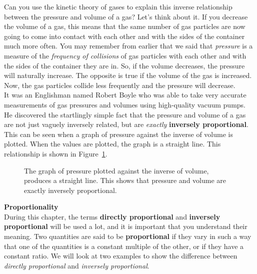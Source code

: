 Can you use the kinetic theory of gases to explain this inverse relationship between the pressure and volume of a gas? Let's think about it. If you decrease the volume of a gas, this means that the same number of gas particles are now going to come into contact with each other and with the sides of the container much more often. You may remember from earlier that we said that \textit{pressure} is a measure of the \textit{frequency of collisions} of gas particles with each other and with the sides of the container they are in. So, if the volume decreases, the pressure will naturally increase. The opposite is true if the volume of the gas is increased. Now, the gas particles collide less frequently and the pressure will decrease.\\

It was an Englishman named Robert Boyle who was able to take very accurate measurements of gas pressures and volumes using high-quality vacuum pumps. He discovered the startlingly simple fact that the pressure and volume of a gas are not just vaguely inversely related, but are \textit{exactly} \textbf{inversely proportional}. This can be seen when a graph of pressure against the inverse of volume is plotted. When the values are plotted, the graph is a straight line. This relationship is shown in Figure~\ref{fig:boyletwo}.
\begin{figure}[H]
\begin{center}
\caption{The graph of pressure plotted against the inverse of volume, produces a straight line. This shows that pressure and volume are exactly inversely proportional.}
\label{fig:boyletwo}
\end{center}
\end{figure}


\textbf{Proportionality}\\
During this chapter, the terms \textbf{directly proportional} and \textbf{inversely proportional} will be used a lot, and it is important that you understand their meaning. Two quantities are said to be \textbf{proportional} if they vary in such a way that one of the quantities is a constant multiple of the other, or if they have a constant ratio. We will look at two examples to show the difference between \textit{directly proportional} and \textit{inversely proportional}.

